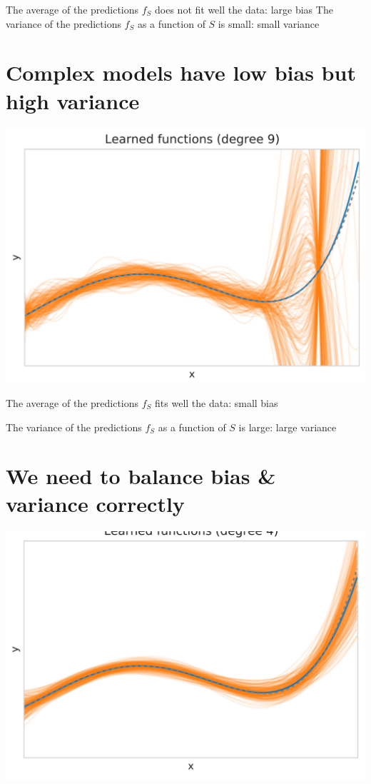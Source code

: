 \documentclass[10pt]{article}
\begin{document}
The average of the predictions $f_{S}$ does not fit well the data: large bias The variance of the predictions $f_{S}$ as a function of $S$ is small: small variance

\section*{Complex models have low bias but high variance}
\begin{center}
\includegraphics[max width=\textwidth]{2023_12_30_442f876157646883c2c9g-12}
\end{center}

The average of the predictions $f_{S}$ fits well the data: small bias

The variance of the predictions $f_{S}$ as a function of $S$ is large: large variance

\section*{We need to balance bias \& variance correctly}
\begin{center}
\includegraphics[max width=\textwidth]{2023_12_30_442f876157646883c2c9g-13}
\end{center}
\end{document}
